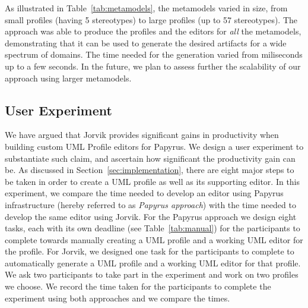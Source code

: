As illustrated in Table~\ref{tab:metamodels}, the metamodels varied in size, from small profiles (having 5 stereotypes) to large profiles (up to 57 
stereotypes). 
The approach was able to produce the profiles and the editors for \textit{all} the metamodels, demonstrating that it can be used to generate the 
desired artifacts for a wide spectrum of domains. 
The time needed for the generation varied from miliseconds up to a few seconds. 
In the future, we plan to assess further the scalability of our approach using larger metamodels.

\subsection{User Experiment}
We have argued that Jorvik provides significant gains in productivity when building custom UML Profile editors for Papyrus.
We design a user experiment to substantiate such claim, and ascertain how significant the productivity gain can be.
As discussed in Section~\ref{sec:implementation}, there are eight major steps to be taken in order to create a UML profile as well as its supporting editor. 
In this experiment, we compare the time needed to develop an editor using Papyrus infrastructure (hereby referred to as \textit{Papyrus approach}) with the time needed to develop the same editor using Jorvik.
For the Papyrus approach we design eight tasks, each with its own deadline (see Table~\ref{tab:manual}) for the participants to complete towards manually creating a UML profile and a working UML editor for the profile.
For Jorvik, we designed one task for the participants to complete to automatically generate a UML profile and a working UML editor for that profile.
We ask two participants to take part in the experiment and work on two profiles we choose. 
We record the time taken for the participants to complete the experiment using both approaches and we compare the times.

